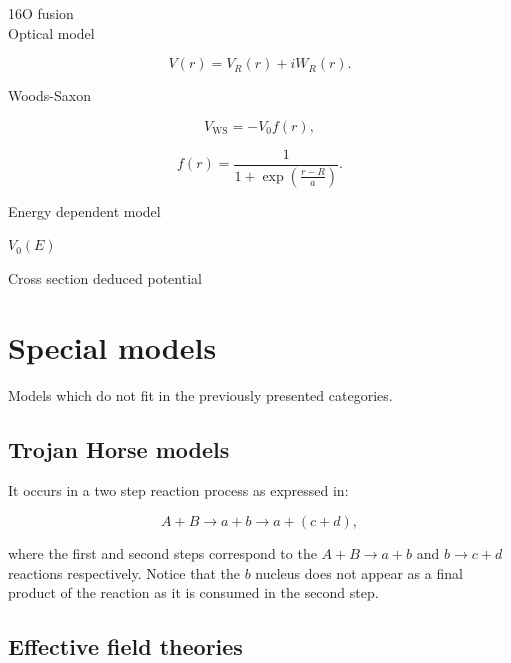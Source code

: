 \documentclass[openany]{book}
\begin{document}
16O fusion \cite{diaz-torres_gasques_wiescher_2007} \\

Optical model \cite{amer_penionzhkevich_2021}

\begin{equation}  \label{eq:potential_Optical}
	V(r) = V_R(r) + iW_R(r).
\end{equation}

Woods-Saxon \cite{salamon_baran_vertse_2016}
\cite{singh_sukhvinder_kharab_2013A}

\begin{equation} \label{eq:potential_WoodsSaxon2}
	V_{\mathrm{WS}} = -V_0 f(r),
\end{equation}

\begin{equation}  \label{eq:potential_WoodsSaxon2_fermiDirac}
	f(r) = \frac{1}{1 + \exp {\left(\frac{r- R}{a}\right)}}.
\end{equation}

Energy dependent model \cite{singh_sukhvinder_kharab_2013B}

$V_0(E)$

Cross section deduced potential \cite{bass_1977} \cite{nandi_swami_gupta_kumar_chakraborty_manjunatha_2022}


\section{Special models} \label{sec:specialModels}

Models which do not fit in the previously presented categories.

\subsection{Trojan Horse models} \label{sub:special_trojanHorse}

It occurs in a two step reaction process as expressed in:

\begin{equation}
	A + B \rightarrow a + b \rightarrow a + (c + d),
\end{equation}\label{eq: special_trojanHorse_reaction}

where the first and second steps correspond to the $A + B \rightarrow a + b$ and $b \rightarrow c + d$ reactions respectively. Notice that the $b$ nucleus does not appear as a final product of the reaction as it is consumed in the second step. 

\subsection{Effective field theories} \label{sub:special_effectiveField}
\end{document}
